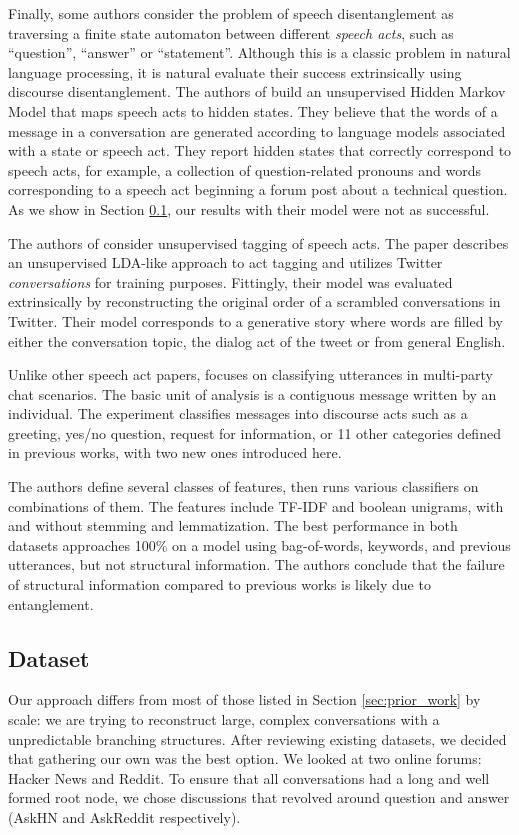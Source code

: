 \documentclass{article}
\begin{document}
Finally, some authors consider the problem of speech disentanglement as traversing 
a finite state automaton between different \textit{speech acts}, such as
``question'', ``answer'' or ``statement''. Although this is a classic problem in
natural language processing, it is natural evaluate their success extrinsically 
using discourse disentanglement. The authors of \cite{Paula} build an 
unsupervised Hidden Markov Model that  maps speech acts to hidden states. 
They believe that the words of a message 
in a conversation are generated according to language models associated
with a state or speech act. They report hidden states
that correctly correspond to speech acts, for example, a collection of
question-related pronouns and words corresponding to a speech act beginning a
forum post about a technical question. As we show in Section \ref{sec:dataset}, 
our results with their model were not as successful.

The authors of \cite{Ritter2010a} consider unsupervised tagging of speech acts.
The paper describes an unsupervised LDA-like approach to act tagging 
and utilizes Twitter \textit{conversations} for
training purposes. Fittingly, their model was evaluated 
extrinsically by reconstructing the original order of a scrambled
conversations in Twitter. Their model corresponds to a generative story
where words are filled by either the conversation topic, the dialog
act of the tweet or from general English.

Unlike other speech act papers, \cite{Kim2012} 
focuses on classifying utterances
in multi-party chat scenarios. The basic unit
of analysis is a contiguous message written by an individual. The
experiment classifies messages into discourse acts such as a greeting, yes/no
question, request for information, or 11 other categories defined in previous
works, with two new ones introduced here.

The authors define several classes of features, then runs various classifiers on
combinations of them. The features include TF-IDF and boolean unigrams, with
and without stemming and lemmatization.  The best
performance in both datasets approaches 100\% on a model using bag-of-words,
keywords, and previous utterances, but not structural information. 
The authors conclude that the failure of structural information 
compared to previous works is likely due to entanglement.

\subsection{Dataset}
\label{sec:dataset}
Our approach differs from most of those listed in Section \ref{sec:prior_work}
by scale: we are trying to reconstruct large, complex
conversations with a unpredictable branching structures. After reviewing existing datasets,
we decided that gathering our own was the best option. We looked at two
online forums: Hacker News and Reddit. To ensure that all conversations had a long
and well formed root node, we chose discussions that revolved around question and answer 
(AskHN and AskReddit respectively). 
\end{document}
